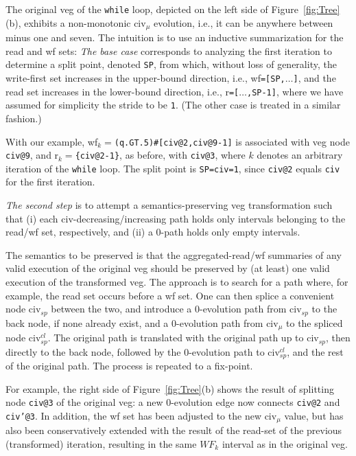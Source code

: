 \documentclass[10pt,nocopyrightspace]{sigplanconf}
\begin{document}
The original {\sc veg} of the {\tt while} loop, depicted on the left 
side of Figure~\ref{fig:Tree}(b), exhibits a non-monotonic {\sc civ}$_\mu$
evolution, i.e., it can be anywhere between minus one and seven.
%
The intuition is to use an inductive summarization for the read and {\sc wf} sets:
{\em The base case} corresponds to analyzing the first iteration to determine a split point, 
denoted {\tt SP}, from which, without loss of generality, the write-first set increases in the 
upper-bound direction, i.e., {\sc wf}{\tt=[SP,$\ldots$]}, and the read set increases 
in the lower-bound direction, i.e., {\sc r}{\tt=[$\ldots$,SP-1]}, where we 
have assumed for simplicity the stride to be {\tt 1}.
(The other case is treated in a similar fashion.)

With our example, {\sc wf}$_k=${\tt (q.GT.5)\#[civ@2,civ@9-1]}
is associated with {\sc veg} node {\tt civ@9}, and 
{\sc r}$_k=${\tt \{civ@2-1\}}, as before, with {\tt civ@3}, 
where $k$ denotes an arbitrary iteration of the {\tt while} loop.
The split point is {\tt SP=civ=1}, since {\tt civ@2} equals {\tt civ} 
for the first iteration.

{\em The second step} is to attempt a semantics-preserving {\sc veg} transformation
such that (i) each {\sc civ}-decreasing/increasing path holds only intervals 
belonging to the read/{\sc wf} set, respectively, and (ii) a $0$-path holds
only empty intervals.

The semantics to be preserved is that the aggregated-read/{\sc wf} summaries of
any valid execution of the original {\sc veg} should be preserved by (at least) 
one valid execution of the transformed {\sc veg}.  The approach is
to search for a path where, for example,  the read set occurs before a {\sc wf} set.
One can then splice a convenient node {\sc civ}$_{sp}$ between the two, and 
introduce a $0$-evolution path from {\sc civ}$_{sp}$ to the back node, 
if none already exist,
and a $0$-evolution path from {\sc civ}$_\mu$ to the spliced node {\sc civ}$_{sp}^{cl}$.
The original path is translated with the original path up to {\sc civ}$_{sp}$,
then directly to the back node, followed by the $0$-evolution path to  
{\sc civ}$_{sp}^{cl}$, and the rest of the original path. The process is
repeated to a fix-point.

For example, the right side of Figure~\ref{fig:Tree}(b) shows the result of
splitting  node {\tt civ@3} of the original {\sc veg}: a new $0$-evolution
edge now connects {\tt civ@2} and {\tt civ'@3}. In addition, the {\sc wf} set 
has been adjusted to the new {\sc civ}$_\mu$ value, but has also
been conservatively extended with the result of the read-set of the previous
(transformed) iteration, resulting in the same $WF_k$ interval as 
in the original {\sc veg}. 
\end{document}
